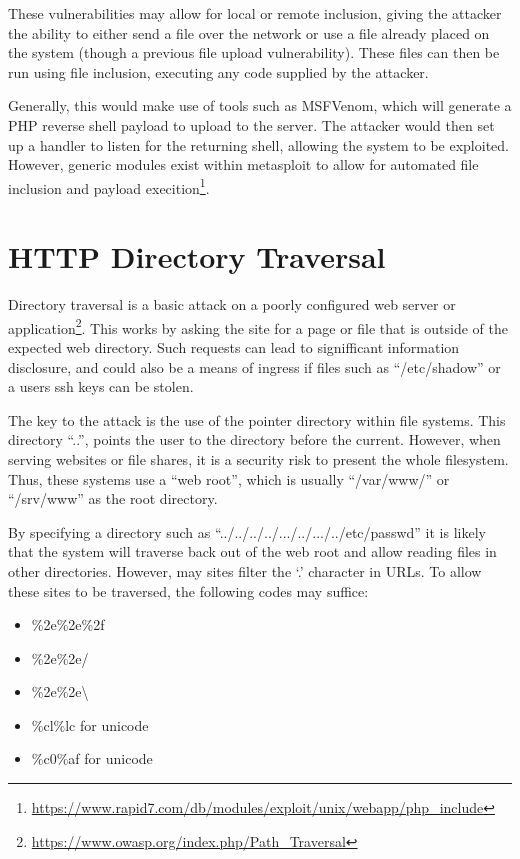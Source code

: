 		These vulnerabilities may allow for local or remote inclusion, giving the attacker the ability to either send a file over the network or use a file already placed on the system (though a previous file upload vulnerability).
		These files can then be run using file inclusion, executing any code supplied by the attacker.

		Generally, this would make use of tools such as MSFVenom, which will generate a PHP reverse shell payload to upload to the server.
		The attacker would then set up a handler to listen for the returning shell, allowing the system to be exploited.
		However, generic modules exist within metasploit to allow for automated file inclusion and payload
		execition\footnote{\url{https://www.rapid7.com/db/modules/exploit/unix/webapp/php\_include}}.


	\section{HTTP Directory Traversal}
		Directory traversal is a basic attack on a poorly configured web server or application\footnote{\url{https://www.owasp.org/index.php/Path\_Traversal}}.
		This works by asking the site for a page or file that is outside of the expected web directory.
		Such requests can lead to signifficant information disclosure, and could also be a means of ingress if files such as ``/etc/shadow'' or a users ssh keys can be stolen.

		The key to the attack is the use of the pointer directory within file systems.
		This directory ``..'', points the user to the directory before the current.
		However, when serving websites or file shares, it is a security risk to present the whole filesystem.
		Thus, these systems use a ``web root'', which is usually ``/var/www/'' or ``/srv/www'' as the root directory.

		By specifying a directory such as ``../../../../.../../.../../etc/passwd'' it is likely that the system will traverse back out of the web root and allow reading files in other directories.
		However, may sites filter the `.' character in URLs.
		To allow these sites to be traversed, the following codes may suffice:
		\begin{itemize}
			\item \%2e\%2e\%2f
			\item \%2e\%2e/
			\item \%2e\%2e\textbackslash
			\item \%cl\%lc for unicode
			\item \%c0\%af for unicode
		\end{itemize}

